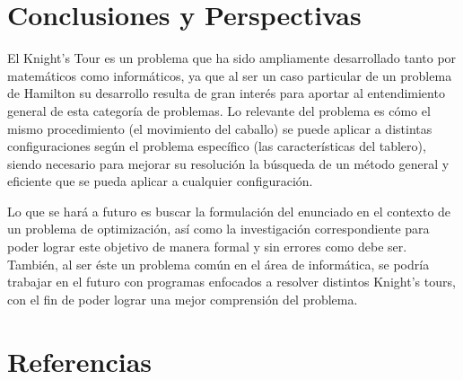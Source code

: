 \documentclass[journal, 10pt]{IEEEtran}
\begin{document}
\section{Conclusiones y Perspectivas}
El Knight’s Tour es un problema que ha sido ampliamente desarrollado tanto por matemáticos como informáticos, ya que al ser un caso particular de un problema de Hamilton su desarrollo resulta de gran interés para aportar al entendimiento general de esta categoría de problemas. Lo relevante del problema es cómo el mismo procedimiento (el movimiento del caballo) se puede aplicar a distintas configuraciones según el problema específico (las características del tablero), siendo necesario para mejorar su resolución la búsqueda de un método general y eficiente que se pueda aplicar a cualquier configuración.

Lo que se hará a futuro es buscar la formulación del enunciado en el contexto de un problema de optimización, así como la investigación correspondiente para poder lograr este objetivo de manera formal y sin errores como debe ser. También, al ser éste un problema común en el área de informática, se podría trabajar en el futuro con programas enfocados a resolver distintos Knight’s tours, con el fin de poder lograr una mejor comprensión del problema.


\section{Referencias}


\end{document}

